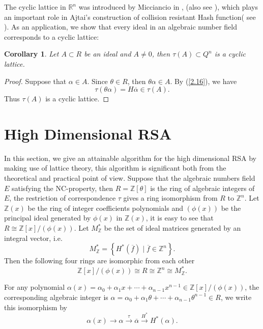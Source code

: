 \documentclass [11pt]{article}
\newtheorem{cor}[thm]{\bf Corollary}
\begin{document}
The cyclic lattice in $\mathbb{R}^{n}$ was introduced by Micciancio in \cite{M3}, (also see \cite{Z}), which  plays an important role in Ajtai's
 construction  of collision resistant  Hash function( see \cite{A}). As an application, we show that every  ideal in an algebraic
  number field corresponds to a cyclic lattice:

  \begin{cor}
Let $ A\subset R $ be an ideal  and $A\neq 0$, then $\tau(A) \subset Q^{n}$ is a cyclic lattice.
\end{cor}
\begin{proof}
Suppose that $\alpha \in A$. Since $\theta \in R$, then $\theta \alpha \in A$. By  (\ref{2.16}), we have
$$
\tau(\theta \alpha)=H \overline{\alpha} \in \tau(A) .
$$
Thus $\tau(A)$ is a cyclic lattice.
\end{proof}

\section{ High Dimensional RSA}

In this section, we give an attainable algorithm for the high dimensional RSA by making use of lattice theory, this algorithm is significant both from the theoretical and practical point of view. Suppose that the algebraic numbers field $E$ satisfying the NC-property, then $R=\mathbb{Z}[\theta]$ is the ring of algebraic integers of $E$, the restriction of correspondence $\tau$ gives a ring isomorphism from $R$
to $\mathbb{Z}^{n}$. Let $\mathbb{Z}(x)$ be the ring of integer coefficients polynomials and $(\phi(x))$ be the principal ideal generated by $\phi(x)$ in $\mathbb{Z}(x)$, it is easy to see that $R \cong \mathbb{Z}[x] / (\phi(x))$. Let $M_{\mathbb{Z}}^{*}$ be the set of ideal matrices generated by an integral vector, i.e.
\begin{equation}\label{3.1}
M_{\mathbb{Z}}^{*}=\left\{H^{*}(\overline{f}) \mid \overline{f} \in \mathbb{Z}^{n}\right\} .
\end{equation}
Then the following four rings are isomorphic from each other
\begin{equation}\label{3.2}
\mathbb{Z}[x]/(\phi(x)) \cong R\cong \mathbb{Z}^{n} \cong M_{\mathbb{Z}}^{*}.
\end{equation}

For any polynomial $ \alpha(x)=\alpha_{0}+\alpha_{1}x+\cdots+\alpha_{n-1}x^{n-1} \in \mathbb{Z}[x]/(\phi(x))$, the corresponding algebraic integer is
$ \alpha=\alpha_{0}+\alpha_{1}\theta+\cdots+\alpha_{n-1}\theta^{n-1}\in R$, we write this  isomorphism by
\begin{equation}\label{3.3}
\alpha(x) \rightarrow \alpha \stackrel{\tau}{\longrightarrow} \overline{\alpha} \stackrel{H^{*}}{\longrightarrow} H^{*}(\alpha).
\end{equation}
\end{document}
